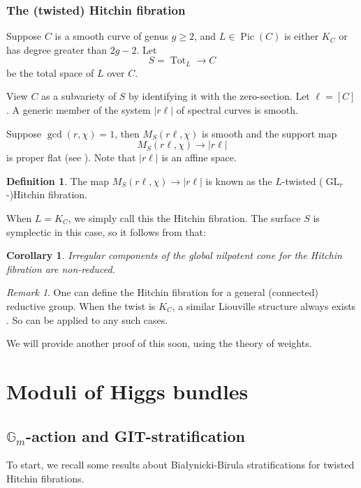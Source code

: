 \documentclass{amsart}
\theoremstyle{plain}
\newtheorem{corollary}[theorem]{Corollary}
\theoremstyle{definition}
\newtheorem{definition}{Definition}[section]
\theoremstyle{remark}
\newtheorem{remark}[theorem]{Remark}
\begin{document}
\subsubsection{The (twisted) Hitchin fibration}
Suppose $C$ is a smooth curve of genus $g\ge 2$, and $L\in\operatorname{Pic}(C)$ is either $K_C$ or has degree greater than $2g-2$.
Let
\[S=\operatorname{Tot}_L\to C\]
be the total space of $L$ over $C$.

View $C$ as a subvariety of $S$ by identifying it with the zero-section.
Let $\ell=[C]$.
A generic member of the system $|r\ell|$ of spectral curves is smooth.

Suppose $\gcd(r,\chi)=1$, then $M_S(r\ell,\chi)$ is smooth and the support map
\[M_S(r\ell,\chi)\to |r\ell|\]
is proper flat (see \cite{chaudlaumon,MSchi}).
Note that $|r\ell|$ is an affine space.
\begin{definition}
    The map $M_S(r\ell,\chi)\to |r\ell|$ is known as the $L$-twisted ($\operatorname{GL}_r$-)Hitchin fibration.
\end{definition}

When $L=K_C$, we simply call this the Hitchin fibration.
The surface $S$ is symplectic in this case, so it follows from  that:
\begin{corollary}\label{cor:hitchin_using_group_scheme}
    Irregular components of the global nilpotent cone for the Hitchin fibration are non-reduced.
\end{corollary}
\begin{remark}
    One can define the Hitchin fibration for a general (connected) reductive group.
    When the twist is $K_C$, a similar Liouville structure always exists \cite{dCHM}.
    So  can be applied to any such cases.
\end{remark}
We will provide another proof of this soon, using the theory of weights.

\section{Moduli of Higgs bundles}\label{sec:Higgs}

\subsection{\texorpdfstring{$\mathbb{G}_m$}{Gm}-action and GIT-stratification}\label{sec:GIT}
To start, we recall some results about Bia{\l}ynicki-Birula stratifications for twisted Hitchin fibrations.
\end{document}
